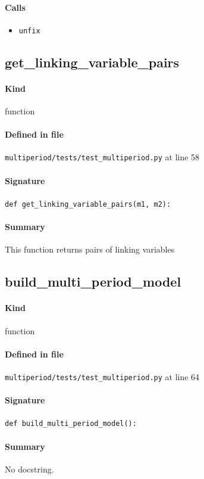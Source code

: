 \documentclass[11pt]{report}
\begin{document}
\paragraph{Calls}
\begin{itemize}[leftmargin=*]
  \item \texttt{unfix}
\end{itemize}
\subsection{get\_linking\_variable\_pairs}
\label{def:multiperiod-tests-test_multiperiod.py:get_linking_variable_pairs:L58}
\paragraph{Kind} function
\paragraph{Defined in file} \texttt{multiperiod/tests/test\_multiperiod.py} at line 58
\paragraph{Signature} \texttt{def get\_linking\_variable\_pairs(m1, m2):}
\paragraph{Summary} This function returns pairs of linking variables
\subsection{build\_multi\_period\_model}
\label{def:multiperiod-tests-test_multiperiod.py:build_multi_period_model:L64}
\paragraph{Kind} function
\paragraph{Defined in file} \texttt{multiperiod/tests/test\_multiperiod.py} at line 64
\paragraph{Signature} \texttt{def build\_multi\_period\_model():}
\paragraph{Summary} No docstring.
\end{document}
